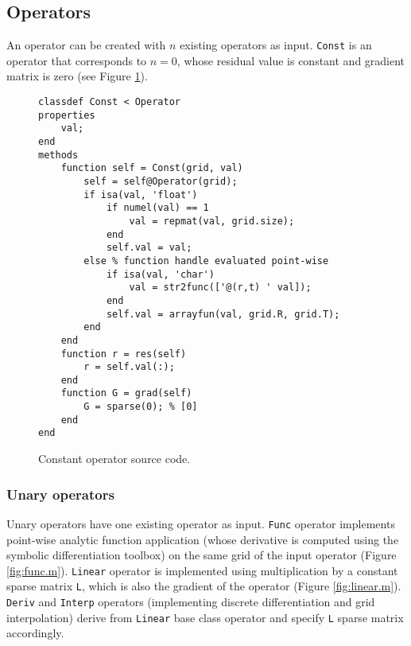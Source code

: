 \documentclass[MSc,beforeExam]{iitcsthesis}
\begin{document}
\subsection{Operators}
An operator can be created with $n$ existing operators as input.
\verb|Const| is an operator that corresponds to $n=0$, whose 
residual value is constant and gradient matrix is zero (see Figure \ref{fig:const.m}).

\begin{figure}[h]
\begin{verbatim}
classdef Const < Operator
properties
    val;
end
methods
    function self = Const(grid, val)
        self = self@Operator(grid);
        if isa(val, 'float')
            if numel(val) == 1
                val = repmat(val, grid.size);
            end
            self.val = val;
        else % function handle evaluated point-wise
            if isa(val, 'char')
                val = str2func(['@(r,t) ' val]);
            end
            self.val = arrayfun(val, grid.R, grid.T);
        end
    end
    function r = res(self)
        r = self.val(:);
    end
    function G = grad(self)
        G = sparse(0); % [0]
    end
end
\end{verbatim}
\caption{Constant operator source code.} \label{fig:const.m}
\end{figure}

\subsubsection{Unary operators}
Unary operators have one existing operator as input. 
\verb|Func| operator implements point-wise analytic function
application (whose derivative is computed using the symbolic differentiation toolbox) on the same grid of the input operator (Figure \ref{fig:func.m}). 
\verb|Linear| operator is implemented
using multiplication by a constant sparse matrix 
\verb|L|, which is also the gradient of the operator
(Figure \ref{fig:linear.m}).
\verb|Deriv| and \verb|Interp| operators (implementing discrete
differentiation and grid interpolation) derive from \verb|Linear|
base class operator and specify \verb|L| sparse matrix accordingly.
\end{document}
